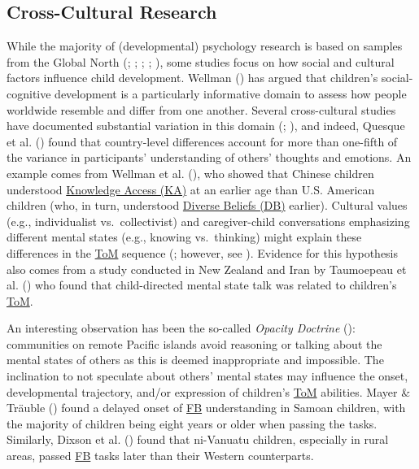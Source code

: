 \documentclass[
]{scrbook}
\begin{document}
\subsection{Cross-Cultural Research}\label{cross-cultural-research}

While the majority of (developmental) psychology research is based on samples from the Global North (; ; ; ; ), some studies focus on how social and cultural factors influence child development. Wellman () has argued that children's social-cognitive development is a particularly informative domain to assess how people worldwide resemble and differ from one another. Several cross-cultural studies have documented substantial variation in this domain (; ), and indeed, Quesque et al. () found that country-level differences account for more than one-fifth of the variance in participants' understanding of others' thoughts and emotions. An example comes from Wellman et al. (), who showed that Chinese children understood \hyperref[acronyms_KA]{Knowledge Access (KA)} at an earlier age than U.S. American children (who, in turn, understood \hyperref[acronyms_DB]{Diverse Beliefs (DB)} earlier). Cultural values (e.g., individualist vs.~collectivist) and caregiver-child conversations emphasizing different mental states (e.g., knowing vs.~thinking) might explain these differences in the \hyperref[acronyms_ToM]{ToM} sequence (; however, see ). Evidence for this hypothesis also comes from a study conducted in New Zealand and Iran by Taumoepeau et al. () who found that child-directed mental state talk was related to children's \hyperref[acronyms_ToM]{ToM}.

An interesting observation has been the so-called \emph{Opacity Doctrine} (): communities on remote Pacific islands avoid reasoning or talking about the mental states of others as this is deemed inappropriate and impossible. The inclination to not speculate about others' mental states may influence the onset, developmental trajectory, and/or expression of children's \hyperref[acronyms_ToM]{ToM} abilities. Mayer \& Träuble () found a delayed onset of \hyperref[acronyms_FB]{FB} understanding in Samoan children, with the majority of children being eight years or older when passing the tasks. Similarly, Dixson et al. () found that ni-Vanuatu children, especially in rural areas, passed \hyperref[acronyms_FB]{FB} tasks later than their Western counterparts.
\end{document}
